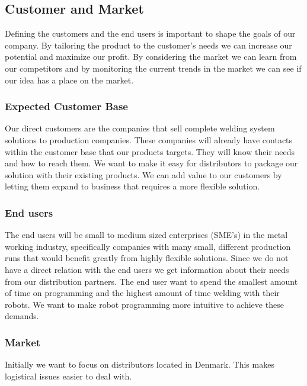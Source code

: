 \subsection{Customer and Market}

Defining the customers and the end users is important to shape the goals of our company. 
By tailoring the product to the customer's needs we can increase our potential and maximize our profit. 
By considering the market we can learn from our competitors and by monitoring the current trends in the market we can see if our idea has a place on the market. 

\subsubsection{Expected Customer Base}
Our direct customers are the companies that sell complete welding system solutions to production companies. 
These companies will already have contacts within the customer base that our products targets.
They will know their needs and how to reach them. 
We want to make it easy for distributors to package our solution with their existing products.
We can add value to our customers by letting them expand to business that requires a more flexible solution.

\subsubsection{End users}
The end users will be small to medium sized enterprises (SME's) in the metal working industry, specifically companies with many small, different production runs that would benefit greatly from highly flexible solutions.
Since we do not have a direct relation with the end users we get information about their needs from our distribution partners.
The end user want to spend the smallest amount of time on programming and the highest amount of time welding with their robots.
We want to make robot programming more intuitive to achieve these demands.

\subsubsection{Market}
\label{market_section}
Initially we want to focus on distributors located in Denmark.
This makes logistical issues easier to deal with.

